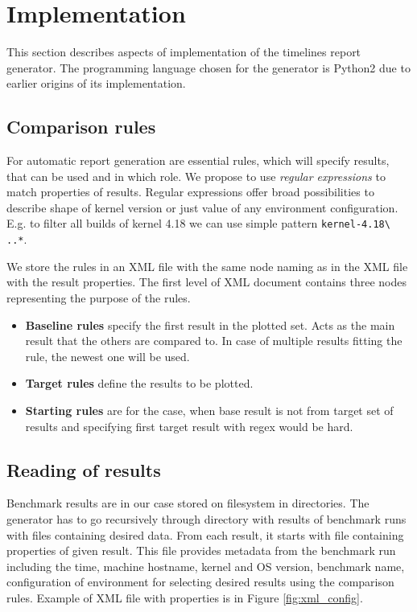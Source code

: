 \section{Implementation}
This section describes aspects of implementation of the timelines report generator.
The programming language chosen for the generator is Python2 due to earlier
origins of its implementation.

\subsection{Comparison rules}
For automatic report generation are essential rules, which will specify results,
that can be used and in which role. We propose to use \emph{regular expressions} to match
properties of results. Regular expressions offer broad possibilities to describe
shape of kernel version or just value of any environment configuration. E.g. to filter
all builds of kernel 4.18 we can use simple pattern \texttt{kernel-4.18\textbackslash
..*}.

We store the rules in an XML file with the same node naming as in the XML file
with the result properties. The first level of XML document contains three nodes
representing the purpose of the rules.
\begin{itemize}
  \item \textbf{Baseline rules} specify the first result in the plotted set.
    Acts as the main result that the others are compared to. In case of multiple
    results fitting the rule, the newest one will be used.
  \item \textbf{Target rules} define the results to be plotted.
  \item \textbf{Starting rules} are for the case, when base result is not from
    target set of results and specifying first target result with regex would be
    hard.
  \end{itemize}

\subsection{Reading of results}
Benchmark results are in our case stored on filesystem in directories. The
generator has to go recursively through directory with results of benchmark runs
with files containing desired data. From each result, it starts with file
containing properties of given result. This file provides metadata from the
benchmark run including the time, machine hostname, kernel and OS version,
benchmark name, configuration of environment for selecting desired results using
the comparison rules. Example of XML file with properties is in Figure
\ref{fig:xml_config}.

